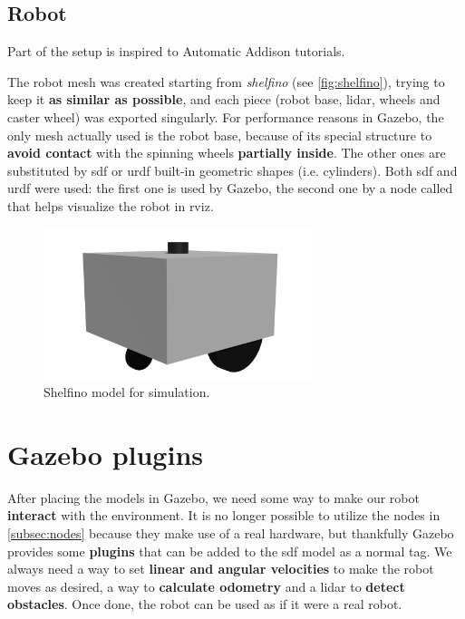 \subsection{Robot}

Part of the setup is inspired to Automatic Addison tutorials\cite{tutorials}. %

The robot mesh was created starting from \textit{shelfino} (see \autoref{fig:shelfino}), trying to keep it \textbf{as similar as possible}, and each piece (robot base, lidar, wheels and caster wheel) was exported singularly. For performance reasons in Gazebo, the only mesh actually used is the robot base, because of its special structure to \textbf{avoid contact} with the spinning wheels \textbf{partially inside}. The other ones are substituted by \acrshort{sdf} or \acrfull{urdf} built-in geometric shapes (i.e. cylinders).
Both \acrshort{sdf} and \acrshort{urdf} were used: the first one is used by Gazebo, the second one by a node called  that helps visualize the robot in \acrshort{rviz}.

\begin{figure}[h]
    \centering
    \includegraphics[width=0.7\textwidth]{images/shelfino_3d.png}
    \caption{Shelfino model for simulation.}
\end{figure}

\section{Gazebo plugins}

After placing the models in Gazebo, we need some way to make our robot \textbf{interact} with the environment. It is no longer possible to utilize the nodes in \autoref{subsec:nodes} because they make use of a real hardware, but thankfully Gazebo provides some \textbf{plugins} that can be added to the \acrshort{sdf} model as a normal tag.
We always need a way to set \textbf{linear and angular velocities} to make the robot moves as desired, a way to \textbf{calculate odometry} and a lidar to \textbf{detect obstacles}. Once done, the robot can be used as if it were a real robot.

